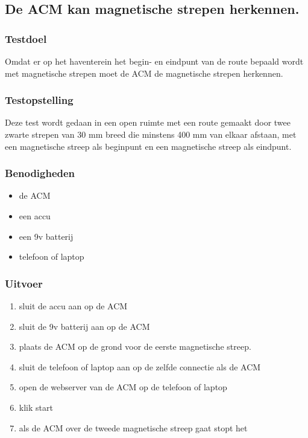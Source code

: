 \subsection{De ACM kan magnetische strepen herkennen.}
\subsubsection{Testdoel}
\begin{flushleft}
    Omdat er op het haventerein het begin- en eindpunt van de route bepaald wordt met magnetische strepen moet de ACM de magnetische strepen herkennen.
\end{flushleft}
\subsubsection{Testopstelling}
\begin{flushleft}
    Deze test wordt gedaan in een open ruimte met een route gemaakt door twee zwarte strepen van 30 mm breed die minstens 400 mm van elkaar afstaan, met een magnetische streep als beginpunt en een magnetische streep als eindpunt.
\end{flushleft}
\subsubsection{Benodigheden}

\begin{itemize}
    \item de ACM
    \item een accu
    \item een 9v batterij
    \item telefoon of laptop
\end{itemize}
\subsubsection{Uitvoer}
\begin{enumerate}
    \item sluit de accu aan op de ACM
    \item sluit de 9v batterij aan op de ACM
    \item plaats de ACM op de grond voor de eerste magnetische streep.
    \item sluit de telefoon of laptop aan op de zelfde connectie als de ACM
    \item open de webserver van de ACM op de telefoon of laptop
    \item klik start
    \item als de ACM over de tweede magnetische streep gaat stopt het
\end{enumerate}
